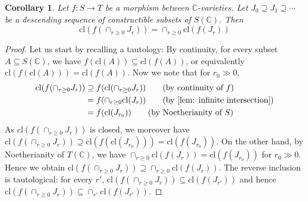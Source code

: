 \documentclass[letter, 11pt]{article}
\theoremstyle{plain}
\newtheorem{corollary}[subsubsection]{Corollary}
\theoremstyle{definition}
\newtheorem{remark}[subsubsection]{Remark}
\newcommand{\IC}{\mathbb{C}}
\newcommand{\IZ}{\mathbb{Z}}
\newcommand{\Spec}{\mathrm{Spec}}
\newcommand{\<}{\langle}
\renewcommand{\>}{\rangle}
\newcommand{\cl}{\mathrm{cl}}
\newcommand{\mpr}{}
\begin{document}




\begin{corollary}
\label{cor: project infinite intersection}
    Let $f : S \to T$ be a morphism between $\IC$-varieties. Let $J_0 \supseteq J_1 \supseteq \cdots$ be a descending sequence of constructible subsets of $S(\IC)$. Then 
    \begin{equation}
        \cl(f(\cap_{r \ge 0} J_r)) = \cap_{r \ge 0} \cl(f(J_r))
    \end{equation}
\end{corollary}
\begin{proof}
    Let us start by recalling a tautology: By continuity, for every subset $A \subseteq S(\IC)$, we have $f(\cl(A)) \subseteq \cl(f(A))$, or equivalently $\cl(f(\cl(A))) = \cl(f(A))$. Now we note that for $r_0 \gg 0$, 
    \begin{align*}
        \cl(f (\cap_{r \ge 0} J_r) ) &\supseteq f(\cl(\cap_{r \ge 0} J_r)) \tag{\textrm{by continuity of $f$}} \\
        &= f(\cap_{r \ge 0} \cl(J_r)) \tag{\textrm{by \cref{lem: infinite intersection}}} \\
        &=  f(\cl(J_{r_0})) \tag{\textrm{by Noetherianity of $S$}} 
    \end{align*}
    As $\cl(f (\cap_{r \ge 0} J_r))$ is closed, we moreover have $\cl(f (\cap_{r \ge 0} J_r)) \supseteq \cl(f(\cl(J_{r_0}))) = \cl(f(J_{r_0}))$. On the other hand, by Noetherianity of $T(\IC)$, we have $\cap_{r \ge 0} \cl(f(J_r)) =  \cl(f(J_{r_0}))$ for $r_0 \gg 0$. Hence we obtain $\cl(f (\cap_{r \ge 0} J_r)) \supseteq \cap_{r \ge 0} \cl(f(J_r))$. The reverse inclusion is tautological: for every $r'$, $\cl(f(\cap_{r \ge 0} J_r)) \subseteq \cl(f(J_{r'}))$ and hence $\cl(f(\cap_{r \ge 0} J_r)) \subseteq \cap_{r'} \cl(f(J_{r'}))$. 
\end{proof}
\end{document}
